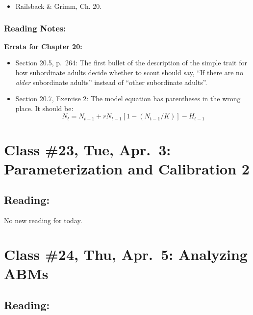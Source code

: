 \documentclass[]{article}
\providecommand{\tightlist}{%
  \setlength{\itemsep}{0pt}\setlength{\parskip}{0pt}}
\begin{document}
\begin{itemize}
\tightlist
\item
  Railsback \& Grimm, Ch. 20.
\end{itemize}

\hypertarget{reading-notes-17}{%
\subsubsection{Reading Notes:}\label{reading-notes-17}}

\textbf{Errata for Chapter 20:}

\begin{itemize}
\item
  Section 20.5, p.~264: The first bullet of the description of the
  simple trait for how subordinate adults decide whether to scout should
  say, ``If there are no \emph{older} subordinate adults'' instead of
  ``other subordinate adults''.
\item
  Section 20.7, Exercise 2: The model equation has parentheses in the
  wrong place. It should be:
  \[ N_t = N_{t-1} + r N_{t-1} [ 1 - (N_{t-1} / K)] - H_{t-1}\]
\end{itemize}

\hypertarget{class-23-tue-apr.3-parameterization-and-calibration-2}{%
\section{Class \#23, Tue, Apr.~3: Parameterization and Calibration
2}\label{class-23-tue-apr.3-parameterization-and-calibration-2}}

\hypertarget{reading-22}{%
\subsection{Reading:}\label{reading-22}}

No new reading for today.

\hypertarget{class-24-thu-apr.5-analyzing-abms}{%
\section{Class \#24, Thu, Apr.~5: Analyzing
ABMs}\label{class-24-thu-apr.5-analyzing-abms}}

\hypertarget{reading-23}{%
\subsection{Reading:}\label{reading-23}}
\end{document}
